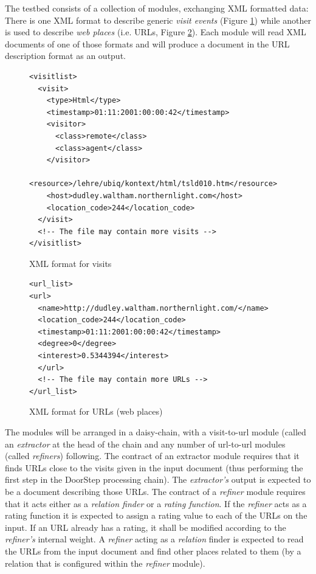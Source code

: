 \documentclass[a4paper]{danarticle}
\theoremstyle{remark}
\begin{document}
      The testbed consists of a collection of modules, exchanging XML formatted 
      data: There is one XML format to describe generic \textit{visit events} 
      (Figure \ref{visitxml}) while another is used to describe \textit{web 
      places} (i.e. URLs, Figure \ref{urlxml}). Each module will read XML 
      documents of one of those formats and will produce a document in the URL 
      description format as an output.
      
      \begin{figure}[ht]
\begin{verbatim}
<visitlist>
  <visit>
    <type>Html</type>
    <timestamp>01:11:2001:00:00:42</timestamp>
    <visitor>
      <class>remote</class>
      <class>agent</class>
    </visitor>
    <resource>/lehre/ubiq/kontext/html/tsld010.htm</resource>
    <host>dudley.waltham.northernlight.com</host>
    <location_code>244</location_code>
  </visit>
  <!-- The file may contain more visits -->
</visitlist>
\end{verbatim}
        \caption{XML format for visits}
	\label{visitxml}
      \end{figure}
      \begin{figure}[ht]
\begin{verbatim}
<url_list>
<url>
  <name>http://dudley.waltham.northernlight.com/</name>
  <location_code>244</location_code>
  <timestamp>01:11:2001:00:00:42</timestamp>
  <degree>0</degree>
  <interest>0.5344394</interest>
  </url>
  <!-- The file may contain more URLs -->
</url_list>
\end{verbatim}
        \caption{XML format for URLs (web places)}
	\label{urlxml}
      \end{figure}
      
      The modules will be arranged in a daisy-chain, with a visit-to-url module 
      (called an \textit{extractor} at the head of the chain and any number of 
      url-to-url modules (called \textit{refiners}) following. The contract of 
      an extractor module requires that it finds URLs close to the visits given 
      in the input document (thus performing the first step in the DoorStep 
      processing chain). The \textit{extractor's} output is expected to be a 
      document describing those URLs. The contract of a \textit{refiner} module 
      requires that it acts either as a \textit{relation finder} or a 
      \textit{rating function}. If the \textit{refiner} acts as a rating 
      function it is expected to assign a rating value to each of the URLs on 
      the input. If an URL already has a rating, it shall be modified according 
      to the \textit{refiner's} internal weight. A \textit{refiner} acting as a 
      \textit{relation} finder is expected to read the URLs from the input 
      document and find other places related to them (by a relation that is 
      configured within the \textit{refiner} module).
      
\end{document}

